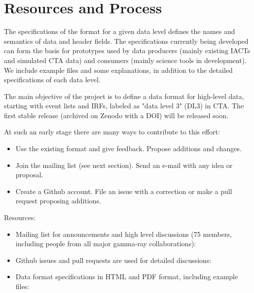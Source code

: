 \section{Resources and Process}


The specifications of the format for a given data level defines the names and semantics of data and header fields. %
The specifications currently being developed can form the basis for prototypes used by data producers (mainly existing IACTs and simulated CTA data) and consumers (mainly science tools in development). We include example files and some explanations, in addition to the detailed specifications of each data level. 

The main objective of the project is to define a data format for high-level data, starting with event lists and IRFs, labeled as "data level 3" (DL3) in CTA. The first stable release (archived on Zenodo with a DOI) will be released soon.

At such an early stage there are many ways to contribute to this effort:

\begin{itemize}
\item{}Use the existing format and give feedback. Propose additions and changes.
\item{}Join the mailing list (see next section). Send an e-mail with any idea or proposal.
\item{}Create a Github account. File an issue with a correction or make a pull request proposing additions.
\end{itemize}


Resources:
\begin{itemize}
\item{} Mailing list for announcements and high level discussions (75 members, including people from all major gamma-ray collaborations): \\ \ogralist
\item{}Github issues and pull requests are used for detailed discussions:\\ \gadfgithub
\item{}Data format specifications in HTML and PDF format, including example files:\\ \gadfrtd
\end{itemize}

